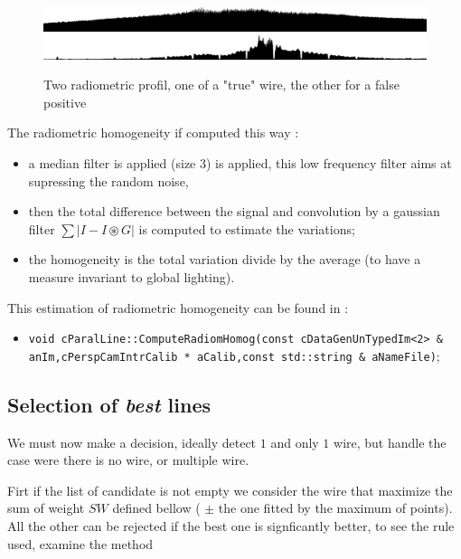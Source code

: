 \begin{figure}
\centering
        \includegraphics[width=14cm]{Methods/ImagesFils/ProfilOK.jpg}
        \includegraphics[width=14cm]{Methods/ImagesFils/ProfilNotOk.jpg}
        \caption{Two radiometric profil, one of a "true" wire, the other for a false positive}
\label{Fig:Line:RadiomProfil}
\end{figure}

The radiometric homogeneity if computed this way :

\begin{itemize}
   \item  a median filter is applied (size $3$) is applied,
          this low frequency filter aims at supressing the random noise,
   \item  then the total difference between the signal and convolution by a gaussian filter $\sum |I-I \circledast G| $ is computed
          to estimate the variations;
   \item  the  homogeneity is the total variation divide by the average (to have a measure
          invariant to global lighting).
\end{itemize}

This estimation of radiometric  homogeneity can be found in :

\begin{itemize}
   \item {\tt void  cParalLine::ComputeRadiomHomog(const cDataGenUnTypedIm<2> \& anIm,cPerspCamIntrCalib * aCalib,const std::string \& aNameFile)};

\end{itemize}


\subsection{Selection of  \emph{best} lines}

We must now make a decision, ideally detect $1$ and only $1$ wire, but handle the case
were there is no wire, or multiple wire.


Firt if the list of candidate is not empty we consider the wire that maximize the sum of weight $SW$
defined bellow ( $\pm$ the one fitted by the maximum of points). All the other can be rejected if 
the best one is signficantly better, to see the rule used, examine the method

